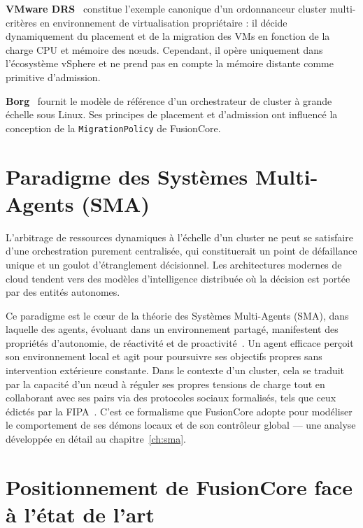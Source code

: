 \textbf{VMware DRS}~\cite{gulati_2012_drs} constitue l'exemple canonique d'un ordonnanceur cluster multi-critères en environnement de virtualisation propriétaire : il décide dynamiquement du placement et de la migration des VMs en fonction de la charge CPU et mémoire des nœuds. Cependant, il opère uniquement dans l'écosystème vSphere et ne prend pas en compte la mémoire distante comme primitive d'admission.

\textbf{Borg}~\cite{verma_2015_borg} fournit le modèle de référence d'un orchestrateur de cluster à grande échelle sous Linux. Ses principes de placement et d'admission ont influencé la conception de la \texttt{MigrationPolicy} de FusionCore.

\section{Paradigme des Systèmes Multi-Agents (SMA)}
\label{sec:fondamentaux-sma}

L'arbitrage de ressources dynamiques à l'échelle d'un cluster ne peut se satisfaire d'une orchestration purement centralisée, qui constituerait un point de défaillance unique et un goulot d'étranglement décisionnel. Les architectures modernes de cloud tendent vers des modèles d'intelligence distribuée où la décision est portée par des entités autonomes.

Ce paradigme est le cœur de la théorie des Systèmes Multi-Agents (SMA), dans laquelle des agents, évoluant dans un environnement partagé, manifestent des propriétés d'autonomie, de réactivité et de proactivité~\cite{wooldridge_2002_sma,ferber_1995_sma}. Un agent efficace perçoit son environnement local et agit pour poursuivre ses objectifs propres sans intervention extérieure constante. Dans le contexte d'un cluster, cela se traduit par la capacité d'un nœud à réguler ses propres tensions de charge tout en collaborant avec ses pairs via des protocoles sociaux formalisés, tels que ceux édictés par la FIPA~\cite{fipa_spec_2002}. C'est ce formalisme que FusionCore adopte pour modéliser le comportement de ses démons locaux et de son contrôleur global — une analyse développée en détail au chapitre~\ref{ch:sma}.

\section{Positionnement de FusionCore face à l'état de l'art}
\label{sec:positionnement}

